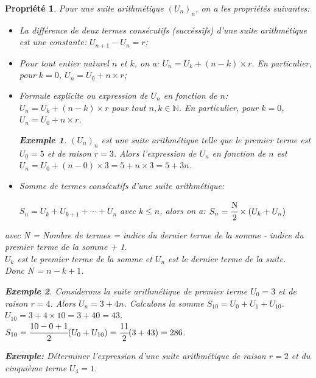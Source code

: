 \documentclass[a4paper, 12pt]{report}
\newtheorem{propriete}{Propriété}[section]
\newtheorem{exemple}{Exemple}[section]
\begin{document}
        \begin{propriete} Pour une suite arithmétique $(U_n)_n$, on a les propriétés suivantes:
            \begin{itemize}
                \item La différence de deux termes consécutifs (succéssifs) d'une suite arithmétique est une constante: $U_{n+1}-U_n=r$;
                \item Pour tout entier naturel $n$ et $k$, on a: $U_n=U_k+(n-k)\times r$. En particulier, pour $k=0$, $U_n=U_0+n\times r$;
                \item Formule explicite ou expression de $U_n$ en fonction de $n$:
                $U_n=U_k+(n-k)\times r$ pour tout $n,k\in\mathbb{N}$. En particulier, pour $k=0$, $U_n=U_0+n\times r$.
                \begin{exemple}
                    $(U_n)_n$ est une suite arithmétique telle que le premier terme est $U_0=5$ et de raison $r=3$. Alors l'expression de 
                    $U_n$ en fonction de $n$ est $U_n=U_0+(n-0)\times 3=5+n\times 3=5+3n$.
                \end{exemple}
                \item Somme de termes consécutifs d'une suite arithmétique:
                \begin{center}
                    $S_n=U_k+U_{k+1}+\cdots+U_n$ avec $k\leq n$, alors on a:
                    $S_n= \cfrac{\text{N}}{2} \times (U_k+U_n)$
                \end{center} 
            \end{itemize}  
            avec N = Nombre de termes = indice du dernier terme de la somme - indice du premier terme de la somme + 1.\\
            $U_k$ est le premier terme de la somme et $U_n$ est le dernier terme de la suite.\\ 
            Donc N = $n-k+1$.
            \begin{exemple}
                Considerons la suite arithmétique de premier terme $U_0=3$ et de raison $r=4$. Alors $U_n=3+4n$.
                Calculons la somme $S_{10}=U_0+U_1+U_{10}$. $U_{10}=3+4\times 10=3+40=43$. \\ 
                $S_{10}=\cfrac{10-0+1}{2}(U_0+U_{10})=\cfrac{11}{2}(3+43)=286$.
            \end{exemple}

\textbf{Exemple:} Déterminer l'expression d'une suite arithmétique de raison $r=2$ et du cinquième terme $U_4=1$.
        \end{propriete}
\end{document}
